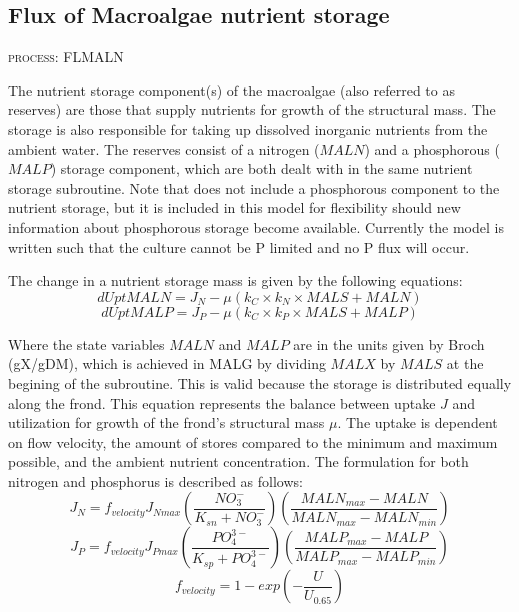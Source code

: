 \documentclass{deltares_manual}
\begin{document}
\subsection{Flux of Macroalgae nutrient storage}
\begin{flushright}
\textsc{process: FLMALN}
\end{flushright}

The nutrient storage component(s) of the macroalgae (also referred to as reserves) are those that supply nutrients for growth of the structural mass. The storage is also responsible for taking up dissolved inorganic nutrients from the ambient water. The reserves consist of a nitrogen ($MALN$) and a phosphorous ($MALP$) storage component, which are both dealt with in the same nutrient storage subroutine. Note that \cite{broch2012} does not include a phosphorous component to the nutrient storage, but it is included in this model for flexibility should new information about phosphorous storage become available. Currently the model is written such that the culture cannot be P limited and no P flux will occur.

The change in a nutrient storage mass is given by the following equations:
\begin{equation}
dUptMALN = J_N - \mu(k_C \times k_N \times MALS + MALN)
\end{equation}
\begin{equation}
dUptMALP = J_P - \mu(k_C \times k_P \times MALS + MALP)
\end{equation}

Where the state variables $MALN$ and $MALP$ are in the units given by Broch (gX/gDM), which is achieved in MALG by dividing $MALX$ by $MALS$ at the begining of the subroutine. This is valid because the storage is distributed equally along the frond. This equation represents the balance between uptake $J$ and utilization for growth of the frond's structural mass $\mu$. The uptake is dependent on flow velocity, the amount of stores compared to the minimum and maximum possible, and the ambient nutrient concentration. The formulation for both nitrogen and phosphorus is described as follows:
\begin{equation}
J_N = f_{velocity}J_{Nmax}(\frac{NO_3^-}{K_{sn}+NO_3^-})(\frac{MALN_{max}-MALN}{MALN_{max}-MALN_{min}})
\end{equation}
\begin{equation}
J_P = f_{velocity}J_{Pmax}(\frac{PO_4^{3-}}{K_{sp}+PO_4^{3-}})(\frac{MALP_{max}-MALP}{MALP_{max}-MALP_{min}})
\end{equation}
\begin{equation}
f_{velocity} = 1-exp(-\frac{U}{U_{0.65}})
\end{equation}
\end{document}
